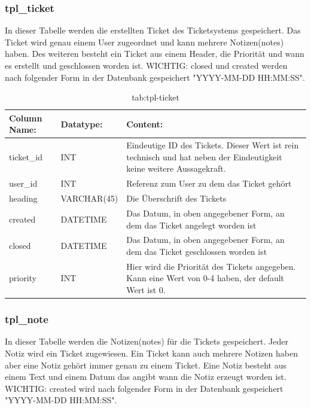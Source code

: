 \subsubsection{tpl\_ticket}

In dieser Tabelle werden die erstellten Ticket des Ticketsystems gespeichert. Das Ticket wird genau einem User zugeordnet und kann mehrere Notizen(notes) haben. Des weiteren besteht ein Ticket aus einem Header, die Priorität und wann es erstellt und geschlossen worden ist.
WICHTIG: closed und created werden nach folgender Form in der Datenbank gespeichert "YYYY-MM-DD HH:MM:SS".

\begin{table}[h]
	\begin{tabular}{|p{3.5cm}|p{4cm}|p{6.2cm}|}
		\hline
		\textbf{Column Name:} & \textbf{Datatype:} & \textbf{Content:}\\
		\hline
		ticket\_id & INT & Eindeutige ID des Tickets. Dieser Wert ist rein technisch und hat neben der Eindeutigkeit keine weitere Aussagekraft.\\
		\hline
		user\_id & INT & Referenz zum User zu dem das Ticket gehört\\
		\hline
		heading & VARCHAR(45) &  Die Überschrift des Tickets\\
		\hline
		created & DATETIME & Das Datum, in oben angegebener Form, an dem das Ticket angelegt worden ist\\
		\hline
		closed & DATETIME & Das Datum, in oben angegebener Form, an dem das Ticket geschlossen worden ist\\
		\hline
		priority & INT & Hier wird die Priorität des Tickets angegeben. Kann eine Wert von 0-4 haben, der default Wert ist 0.\\
		\hline
	\end{tabular}
	\caption{tab:tpl-ticket}
\end{table}
\label{tab:tpl_ticket}

\newpage

\subsubsection{tpl\_note}

In dieser Tabelle werden die Notizen(notes) für die Tickets gespeichert. Jeder Notiz wird ein Ticket zugewiesen. Ein Ticket kann auch mehrere Notizen haben aber eine Notiz gehört immer genau zu einem Ticket. Eine Notiz besteht aus einem Text und einem Datum das angibt wann die Notiz erzeugt worden ist.
WICHTIG: created wird nach folgender Form in der Datenbank gespeichert "YYYY-MM-DD HH:MM:SS".

